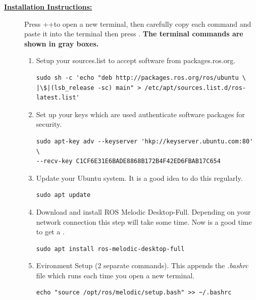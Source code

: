 \documentclass[12pt]{article}
\newcommand{\T}{\raisebox{-0.1em}{T}}
\newcommand{\TKey}{\keystroke{\T}}
\newcommand{\CTRL}{\raisebox{-0.1em}{Ctrl}}
\newcommand{\CTRLKey}{\keystroke{\CTRL}}
\newcommand{\ALT}{\raisebox{-0.1em}{Alt}}
\newcommand{\ALTKey}{\keystroke{\ALT}}
\newcommand{\ENTER}{\raisebox{-0.1em}{Enter}}
\newcommand{\ENTERKey}{\keystroke{\ENTER}}
\begin{document}
\begin{description}
\item[\textbf{\underline{Installation Instructions:}}] \hfill \vspace{0mm}

Press \CTRLKey+\ALTKey+\TKey to open a new terminal, then carefully copy each command and paste it into the terminal then press \ENTERKey. { \bf The terminal commands are shown in gray boxes.}


\begin{enumerate}
	
	
	\item  Setup your sources.list to accept software from packages.ros.org.

	\begin{verbatim}
sudo sh -c 'echo "deb http://packages.ros.org/ros/ubuntu \
|\$|(lsb_release -sc) main" > /etc/apt/sources.list.d/ros-latest.list'
	\end{verbatim}
	
	\item Set up your keys which are used authenticate software packages for security.
	
	\begin{verbatim}
sudo apt-key adv --keyserver 'hkp://keyserver.ubuntu.com:80' \ 
--recv-key C1CF6E31E6BADE8868B172B4F42ED6FBAB17C654
	\end{verbatim}
				
	\item Update your Ubuntu system. It is a good idea to do this regularly.  
	
	\begin{verbatim}
sudo apt update
	\end{verbatim}

\newpage
	
	\item Download and install ROS Melodic Desktop-Full. Depending on your network connection this step will take some time. Now is a good time to get a \Coffeecup \Cooley.  
	
	\begin{verbatim}
sudo apt install ros-melodic-desktop-full
	\end{verbatim}

\item Evironment Setup (2 separate commands). This appends the {\it .bashrc} file which runs each time you open a new terminal. 
\begin{verbatim} 
echo "source /opt/ros/melodic/setup.bash" >> ~/.bashrc
\end{verbatim}


\end{enumerate}
\end{description}
\end{document}
